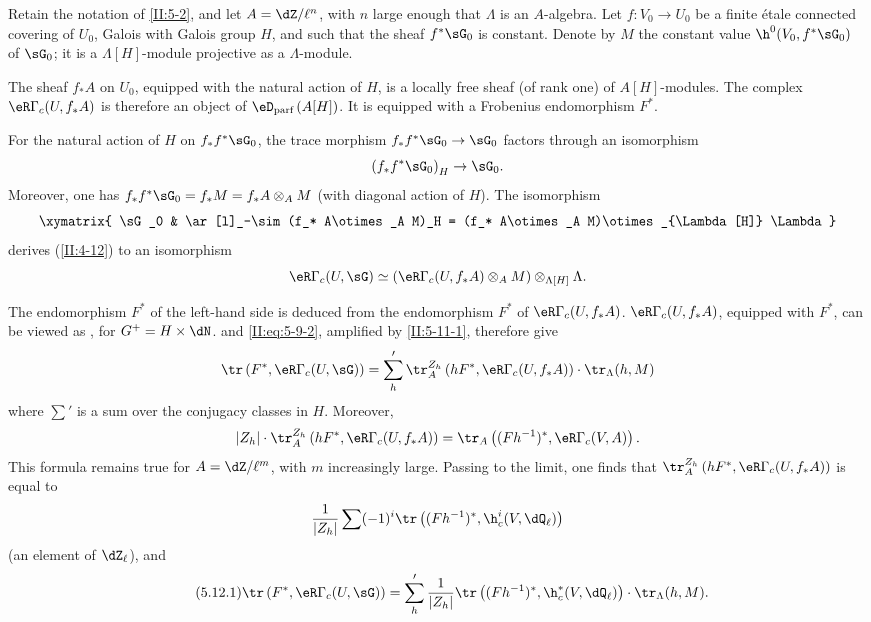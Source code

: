 Retain the notation of \ref{II:5-2}, and let $A=\dZ/\ell^n$, with $n$ large
enough that $\Lambda$ is an $A$-algebra. Let $f:V_0\to U_0$ be a finite
\'etale connected covering of $U_0$, Galois with Galois group $H$, and such
that the sheaf $f^*\sG_0$ is constant. Denote by $M$ the constant value $\h^0(V_0,f^*\sG_0)$ of $\sG_0$; it is a $\Lambda[H]$-module projective as a
$\Lambda$-module.

The sheaf $f_* A$ on $U_0$, equipped with the natural action of $H$, is a
locally free sheaf (of rank one) of $A[H]$-modules. The complex
$\eR\Gamma_c(U,f_* A)$ is therefore an object of
$\eD_\text{parf}\left(A[H]\right)$. It is equipped with a Frobenius
endomorphism $F^*$.

For the natural action of $H$ on $f_* f^*\sG_0$, the trace morphism
$f_* f^*\sG_0\to\sG_0$ factors through an isomorphism
\[
  \left(f_* f^*\sG_0\right)_H \to \sG_0 \text{.}
\]
Moreover, one has $f_* f^*\sG_0=f_* M=f_* A\otimes_A M$ (with diagonal action of
$H$). The isomorphism
\[\xymatrix{
  \sG_0
    & \ar[l]_-\sim (f_* A\otimes_A M)_H = (f_* A\otimes_A M)\otimes_{\Lambda[H]} \Lambda
}\]
derives (\ref{II:4-12}) to an isomorphism
\[
  \eR\Gamma_c(U,\sG) \simeq \left(\eR\Gamma_c(U,f_* A)\otimes_A M\right)\otimes_{\Lambda[H]} \Lambda \text{.}
\]

The endomorphism $F^*$ of the left-hand side is deduced from the
endomorphism $F^*$ of $\eR\Gamma_c(U,f_* A)$.  $\eR\Gamma_c(U,f_* A)$, equipped with $F^*$, can be
viewed as , for $G^+=H\times \dN$.
 and \eqref{II:eq:5-9-2}, amplified by
\ref{II:5-11-1}, therefore give
\[
  \tr\left(F^*,\eR\Gamma_c(U,\sG)\right) = \sum_h' \tr_A^{Z_h}\left(h F^*,\eR\Gamma_c(U,f_* A)\right)\cdot \tr_\Lambda(h,M)
\]
where $\sum'$ is a sum over the conjugacy classes in $H$. Moreover,
\[
  |Z_h|\cdot \tr_A^{Z_h}\left(h F^*,\eR\Gamma_c(U,f_* A)\right) = \tr_A\left((F h^{-1})^*,\eR\Gamma_c(V,A)\right) \text{.}
\]
This formula remains true for $A=\dZ/\ell^m$, with $m$ increasingly large.
Passing to the limit, one finds that
$\tr_A^{Z_h}\left(h F^*,\eR\Gamma_c(U,f_* A)\right)$ is equal to
\[
  \frac{1}{|Z_h|} \sum (-1)^i \tr\left((F h^{-1})^*,\h_c^i(V,\dQ_\ell)\right)
\]
(an element of $\dZ_\ell$), and
\begin{equation*}\tag{5.12.1}\label{II:eq:5-12-1}
\tr\left(F^*,\eR\Gamma_c(U,\sG)\right) = \sum_h' \frac{1}{|Z_h|} \tr\left((F h^{-1})^*,\h_c^*(V,\dQ_\ell)\right)\cdot \tr_\Lambda(h,M) \text{.}
\end{equation*}






